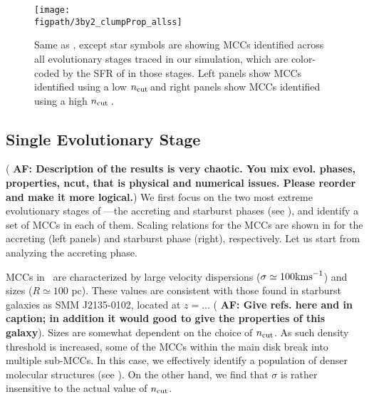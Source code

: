 \IfFileExists{emulateapjlegacy.cls}{\documentclass[iop]{emulateapjlegacy}}{\documentclass[iop]{emulateapj}}
\newcommand{\AF}[1]{({\bf \color{afcolor} AF: #1})}
\def\figpath{./Fig}
\begin{document}
\begin{figure*}
\centering
\texttt{[image: \\figpath/3by2\_clumpProp\_allss]}
\caption{Same as , except star symbols are showing MCCs identified across all evolutionary stages traced in our simulation, which are color-coded by the SFR of \flower in those stages. Left panels show MCCs identified using a low $n_{\rm cut}$\,\cc and right panels show MCCs identified using a high $n_{\rm cut}$\,\cc.
\label{fig:alpha16-28}}
\end{figure*}

\subsection{Single Evolutionary Stage}  \label{sec:singless}
\AF{Description of the results is very chaotic. You mix evol. phases, properties, ncut, that is physical and numerical issues. Please reorder and make it more logical.}
We first focus on the two most extreme evolutionary stages of \flower---the accreting and starburst phases (see ), and identify a set of MCCs in each of them. Scaling relations for the MCCs are shown in  for the accreting (left panels) and starburst phase (right), respectively. Let us start from analyzing the accreting phase.

MCCs in \flower\ are characterized by large velocity dispersions ($\sigma \simeq 100 {\rm km s}^{-1}$) and sizes ($R\simeq 100$ pc). These values are consistent with those found in starburst galaxies as SMM J2135-0102, located at $z=...$ \AF{Give refs. here and in caption; in addition it would good to give the properties of this galaxy}. 
Sizes are somewhat dependent on the choice of $n_{\rm cut}$. As such density threshold is increased, some of the MCCs within the main disk break into multiple sub-MCCs. In this case, we effectively identify a population of denser molecular structures (see ). On the other hand, we find that $\sigma$ is rather insensitive to the actual value of $n_{\rm cut}$. 

\end{document}
